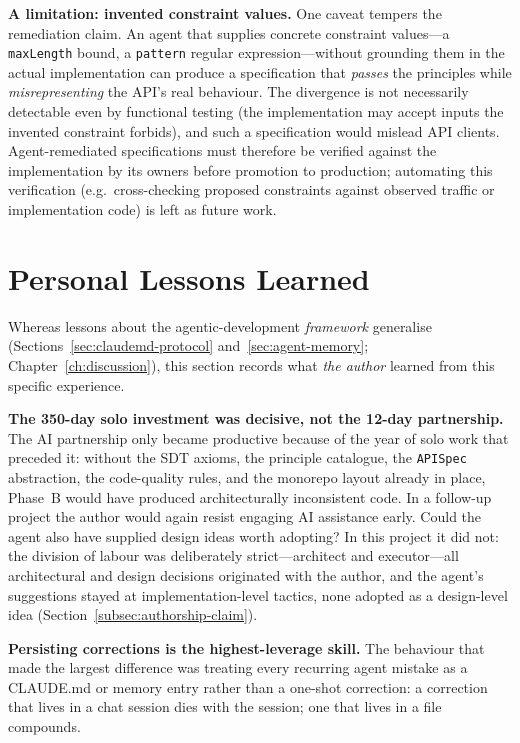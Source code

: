 \textbf{A limitation: invented constraint values.} One caveat tempers the remediation claim. An agent that supplies concrete constraint values---a \texttt{maxLength} bound, a \texttt{pattern} regular expression---without grounding them in the actual implementation can produce a specification that \emph{passes} the principles while \emph{misrepresenting} the API's real behaviour. The divergence is not necessarily detectable even by functional testing (the implementation may accept inputs the invented constraint forbids), and such a specification would mislead API clients. Agent-remediated specifications must therefore be verified against the implementation by its owners before promotion to production; automating this verification (e.g.\ cross-checking proposed constraints against observed traffic or implementation code) is left as future work.

\section{Personal Lessons Learned}
\label{sec:personal-lessons}

Whereas lessons about the agentic-development \emph{framework} generalise (Sections~\ref{sec:claudemd-protocol} and~\ref{sec:agent-memory}; Chapter~\ref{ch:discussion}), this section records what \emph{the author} learned from this specific experience.

\textbf{The 350-day solo investment was decisive, not the 12-day partnership.} The AI partnership only became productive because of the year of solo work that preceded it: without the SDT axioms, the principle catalogue, the \texttt{APISpec} abstraction, the code-quality rules, and the monorepo layout already in place, Phase~B would have produced architecturally inconsistent code. In a follow-up project the author would again resist engaging AI assistance early. Could the agent also have supplied design ideas worth adopting? In this project it did not: the division of labour was deliberately strict---architect and executor---all architectural and design decisions originated with the author, and the agent's suggestions stayed at implementation-level tactics, none adopted as a design-level idea (Section~\ref{subsec:authorship-claim}).

\textbf{Persisting corrections is the highest-leverage skill.} The behaviour that made the largest difference was treating every recurring agent mistake as a CLAUDE.md or memory entry rather than a one-shot correction: a correction that lives in a chat session dies with the session; one that lives in a file compounds.


